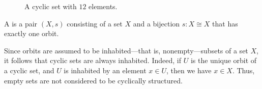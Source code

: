 \begin{figure}[t]
  \centering
  \caption[A cyclic set with $12$ elements]{\label{figure:cyclically-ordered-set}A cyclic set with $12$ elements.}
\end{figure}

\begin{definition}
  A  is a pair $(X,s)$ consisting of a set $X$ and a bijection $s:X\cong X$ that has exactly one orbit.
\end{definition}

\begin{remark}
  Since orbits are assumed to be inhabited---that is, nonempty---subsets of a set $X$, it follows that cyclic sets are always inhabited. Indeed, if $U$ is the unique orbit of a cyclic set, and $U$ is inhabited by an element $x\in U$, then we have $x\in X$. Thus, empty sets are not considered to be cyclically structured.
\end{remark}

